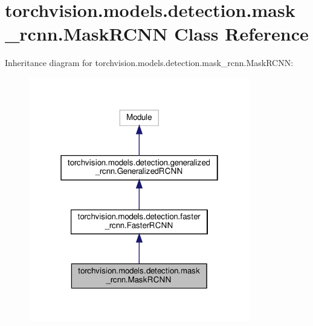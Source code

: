\hypertarget{classtorchvision_1_1models_1_1detection_1_1mask__rcnn_1_1MaskRCNN}{}\section{torchvision.\+models.\+detection.\+mask\+\_\+rcnn.\+Mask\+R\+C\+NN Class Reference}
\label{classtorchvision_1_1models_1_1detection_1_1mask__rcnn_1_1MaskRCNN}


Inheritance diagram for torchvision.\+models.\+detection.\+mask\+\_\+rcnn.\+Mask\+R\+C\+NN\+:
\nopagebreak
\begin{figure}[H]
\begin{center}
\leavevmode
\includegraphics[width=274pt]{classtorchvision_1_1models_1_1detection_1_1mask__rcnn_1_1MaskRCNN__inherit__graph}
\end{center}
\end{figure}


